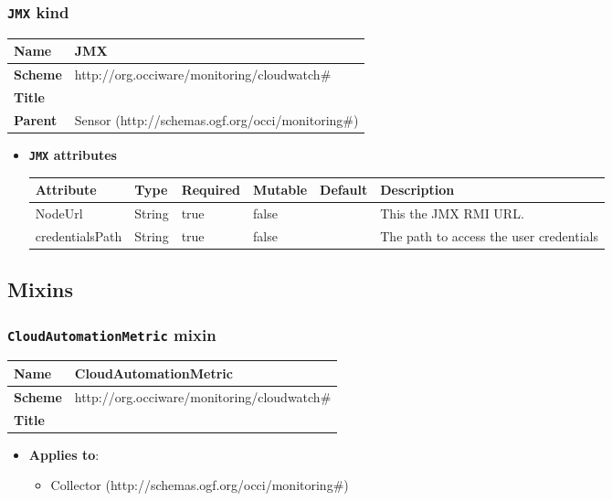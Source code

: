 \subsubsection{\texttt{JMX} kind}
\begin{center}
\begin{tabular}{|l|l|}
  \hline
  \textbf{Name} & JMX \\
  \hline  
  \textbf{Scheme} & http://org.occiware/monitoring/cloudwatch\# \\
  \hline
  \textbf{Title} &  \\
  \hline
  \textbf{Parent} & Sensor (http://schemas.ogf.org/occi/monitoring\#) \\
  \hline
\end{tabular}
\end{center}
\begin{itemize}
\item \textbf{\texttt{JMX} attributes}

\begin{tabularx}{\textwidth}{|l|l|p{1.4cm}|p{1.3cm}|l|X|}
  \hline
  \textbf{Attribute} & \textbf{Type} & \textbf{Required} & \textbf{Mutable} & \textbf{Default} & \textbf{Description} \\
  \hline  
  NodeUrl & String & true & false &  & This the JMX RMI URL. \\
  \hline
  credentialsPath & String & true & false &  & The path to access the user credentials \\
  \hline
\end{tabularx}
\end{itemize}



\subsection{Mixins}
\subsubsection{\texttt{CloudAutomationMetric} mixin}
\begin{center}
\begin{tabular}{|l|l|}
  \hline
  \textbf{Name} & CloudAutomationMetric \\
  \hline  
  \textbf{Scheme} & http://org.occiware/monitoring/cloudwatch\# \\
  \hline
  \textbf{Title} &  \\
  \hline
\end{tabular}
\end{center}
\begin{itemize}
\item \textbf{Applies to}:
\begin{itemize}
	\item Collector (http://schemas.ogf.org/occi/monitoring\#)
\end{itemize}
\end{itemize} 

